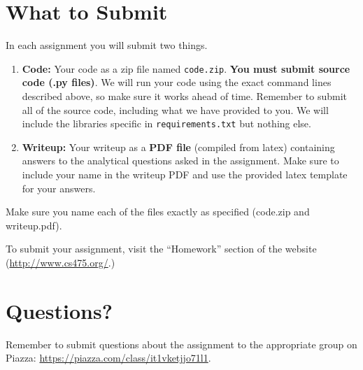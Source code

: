 \documentclass[11pt]{article}
\begin{document}
	\section{What to Submit}
	In each assignment you will submit two things.
	\begin{enumerate}
		\item {\bf Code:} Your code as a zip file named {\tt code.zip}. {\bf You must submit source code (.py files)}. We will run your code using the exact command lines described above, so make sure it works ahead of time. Remember to submit all of the source code, including what we have provided to you. We will include the libraries specific in {\tt requirements.txt} but nothing else.
		\item {\bf Writeup:} Your writeup as a {\bf PDF file} (compiled from latex) containing answers to the analytical questions asked in the assignment. Make sure to include your name in the writeup PDF and use the provided latex template for your answers.
	\end{enumerate}
	Make sure you name each of the files exactly as specified (code.zip and writeup.pdf).
	
	To submit your assignment, visit the ``Homework'' section of the website (\href{http://www.cs475.org/}{http://www.cs475.org/}.)
	
	
	
	\section{Questions?}
	Remember to submit questions about the assignment to the appropriate group on Piazza: \href{https://piazza.com/class/it1vketjjo71l1}{https://piazza.com/class/it1vketjjo71l1}.
	
\end{document}

